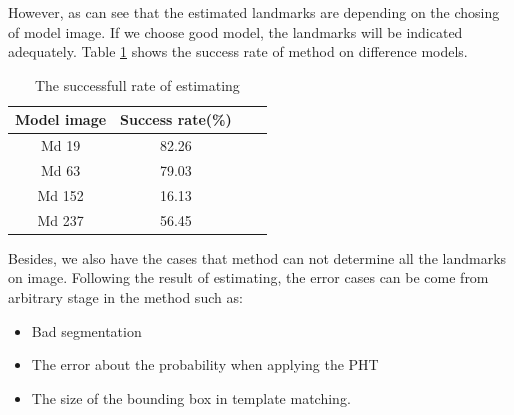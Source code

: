 However, as can see that the estimated landmarks are depending on the chosing of model image. If we choose good model, the landmarks will be indicated adequately. Table \ref{table_successrate} shows the success rate of method on difference models. 
\begin{table}[!h]
	\centering
	\begin{tabular}{|c|c|c|c|}
		\hline
		Model image & Success rate(\%) \\ \hline
		Md 19 & 82.26 \\ \hline
		Md 63 & 79.03 \\ \hline
		Md 152 & 16.13 \\ \hline
		Md 237 & 56.45\\ \hline
	\end{tabular}	
	\caption{The successfull rate of estimating}		
	\label{table_successrate}
\end{table}
Besides, we also have the cases that method can not determine all the landmarks on image. Following the result of estimating, the error cases can be come from arbitrary stage in the method such as:
\begin{itemize}
	\item Bad segmentation
	\item The error about the probability when applying the PHT
	\item The size of the bounding box in template matching.
\end{itemize}



 
